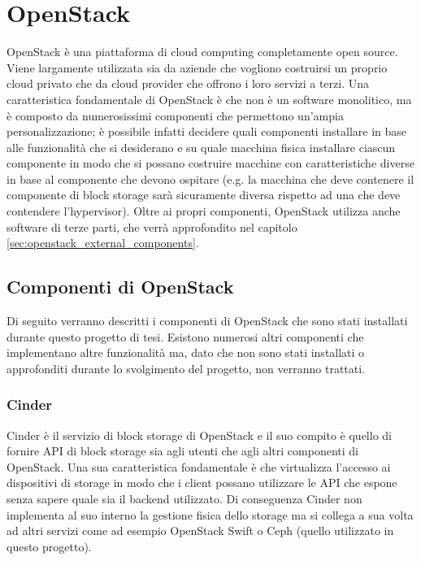 \chapter{OpenStack}

OpenStack è una piattaforma di cloud computing completamente open source. Viene largamente utilizzata sia da aziende che vogliono costruirsi un proprio cloud privato che da cloud provider che offrono i loro servizi a terzi.
Una caratteristica fondamentale di OpenStack è che non è un software monolitico, ma è composto da numerosissimi componenti che permettono un'ampia personalizzazione; è possibile infatti decidere quali componenti installare in base alle funzionalità che si desiderano e su quale macchina fisica installare ciascun componente in modo che si possano costruire macchine con caratteristiche diverse in base al componente che devono ospitare (e.g. la macchina che deve contenere il componente di block storage sarà sicuramente diversa rispetto ad una che deve contendere l'hypervisor).
Oltre ai propri componenti, OpenStack utilizza anche software di terze parti, che verrà approfondito nel capitolo \ref{sec:openstack_external_components}.

\section{Componenti di OpenStack}

Di seguito verranno descritti i componenti di OpenStack che sono stati installati durante questo progetto di tesi. Esistono numerosi altri componenti che implementano altre funzionalità ma, dato che non sono stati installati o approfonditi durante lo svolgimento del progetto, non verranno trattati.

\subsection{Cinder}\label{sec:openstack_cinder}
Cinder è il servizio di block storage di OpenStack e il suo compito è quello di fornire API di block storage sia agli utenti che agli altri componenti di OpenStack. Una sua caratteristica fondamentale è che virtualizza l'accesso ai dispositivi di storage in modo che i client possano utilizzare le API che espone senza sapere quale sia il backend utilizzato. Di conseguenza Cinder non implementa al suo interno la gestione fisica dello storage ma si collega a sua volta ad altri servizi come ad esempio OpenStack Swift o Ceph (quello utilizzato in questo progetto).

